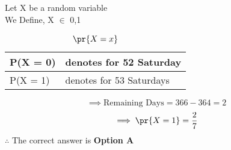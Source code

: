 
Let X be a random variable \\
 We Define, X $\in$ {{0,1}} \\
 \begin{table}[h]
\begin{tabular}{|l|l|}
\hline
P(X = 0) & denotes for 52 Saturday  \\ \hline
P(X = 1) & denotes for 53 Saturdays \\ \hline
\end{tabular}
\caption{$\pr{X = x}$}
\end{table}
\begin{equation}
\label{ee:2013-611}
    \implies \text{Remaining Days} = 366 - 364 = 2
\end{equation}
\begin{equation}
\label{ee:2013-612}
\implies\pr{X = 1} = \frac{2}{7}
\end{equation}
 $\therefore$ The correct answer is \textbf{Option A}